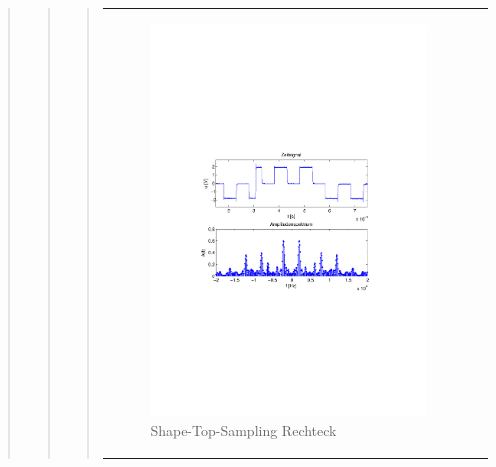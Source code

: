 \begin{quote}
\begin{quote}
\begin{quote}
\begin{center}
\begin{tabular}{ll}
            \hspace{-5cm}
                \begin{minipage}{0.6\textwidth}
                    \begin{figure}[H]
                        \includegraphics[scale=0.7, trim = 35mm 100mm 35mm 95mm, clip]{Bilder/shapeskizze}
                          \caption{Shape-Top-Sampling Rechteck}
		                  \label{fig:shaperec}
                    \end{figure}
                \end{minipage}
                

\end{tabular}
\end{center}
\end{quote}
\end{quote}
\end{quote}
